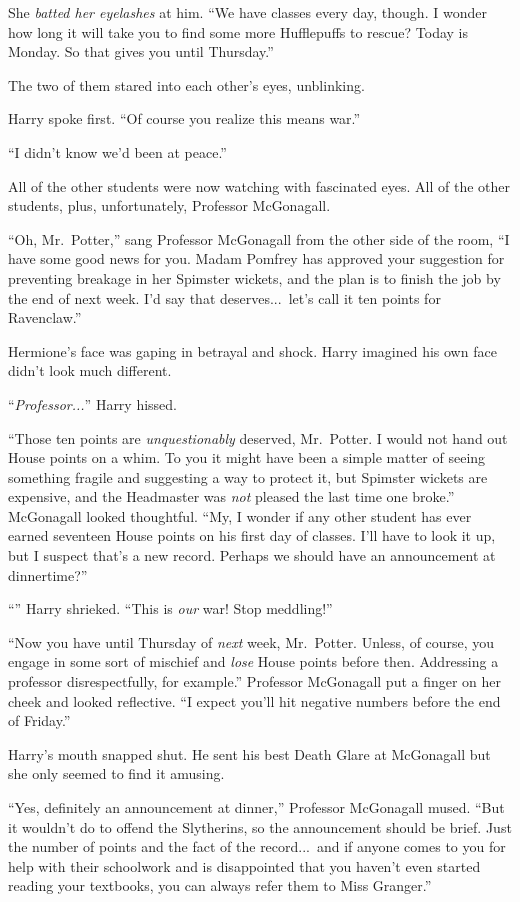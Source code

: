 She \emph{batted her eyelashes} at him. “We have classes every day, though. I wonder how long it will take you to find some more Hufflepuffs to rescue? Today is Monday. So that gives you until Thursday.”

The two of them stared into each other’s eyes, unblinking.

Harry spoke first. “Of course you realize this means war.”

“I didn’t know we’d been at peace.”

All of the other students were now watching with fascinated eyes. All of the other students, plus, unfortunately, Professor McGonagall.

“Oh, Mr.~Potter,” sang Professor McGonagall from the other side of the room, “I have some good news for you. Madam Pomfrey has approved your suggestion for preventing breakage in her Spimster wickets, and the plan is to finish the job by the end of next week. I’d say that deserves...\ let’s call it ten points for Ravenclaw.”

Hermione’s face was gaping in betrayal and shock. Harry imagined his own face didn’t look much different.

“\emph{Professor...}” Harry hissed.

“Those ten points are \emph{unquestionably} deserved, Mr.~Potter. I would not hand out House points on a whim. To you it might have been a simple matter of seeing something fragile and suggesting a way to protect it, but Spimster wickets are expensive, and the Headmaster was \emph{not} pleased the last time one broke.” McGonagall looked thoughtful. “My, I wonder if any other student has ever earned seventeen House points on his first day of classes. I’ll have to look it up, but I suspect that’s a new record. Perhaps we should have an announcement at dinnertime?”

“” Harry shrieked. “This is \emph{our} war! Stop meddling!”

“Now you have until Thursday of \emph{next} week, Mr.~Potter. Unless, of course, you engage in some sort of mischief and \emph{lose} House points before then. Addressing a professor disrespectfully, for example.” Professor McGonagall put a finger on her cheek and looked reflective. “I expect you’ll hit negative numbers before the end of Friday.”

Harry’s mouth snapped shut. He sent his best Death Glare at McGonagall but she only seemed to find it amusing.

“Yes, definitely an announcement at dinner,” Professor McGonagall mused. “But it wouldn’t do to offend the Slytherins, so the announcement should be brief. Just the number of points and the fact of the record...\ and if anyone comes to you for help with their schoolwork and is disappointed that you haven’t even started reading your textbooks, you can always refer them to Miss Granger.”


